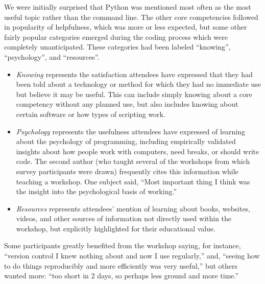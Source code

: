 \documentclass[10pt, twocolumn]{article}
\begin{document}
We were initially surprised that Python was mentioned most often as the most useful topic rather than the command line.
The other core competencies followed in popularity of helpfulness,
which was more or less expected,
but some other fairly popular categories emerged during the coding process which were completely unanticipated.
These categories had been labeled ``knowing'', ``psychology'', and ``resources''.

\begin{figure}
\end{figure}

\begin{itemize}

	\item
	\emph{Knowing} represents the satisfaction attendees have expressed that they had been told about a technology or method
	for which they had no immediate use but believe it may be useful.
	This can include simply knowing about a core competency without any planned use,
	but also includes knowing about certain software or how types of scripting work.
	
	\item
	\emph{Psychology} represents the usefulness attendees have expressed of learning about the psychology of programming,
	including empirically validated insights about how people work with computers,
	need breaks,
	or should write code.
	The second author (who taught several of the workshops from which survey participants were drawn)
	frequently cites this information while teaching a workshop.
        One subject said,
        ``Most important thing I think was the insight into the psychological basis of working.''
	
	\item
	\emph{Resources} represents attendees' mention of learning about books, websites, videos, and other sources of information
	not directly used within the workshop,
	but explicitly highlighted for their educational value.

\end{itemize}

Some participants greatly benefited from the workshop saying,
for instance,
``version control I knew nothing about and now I use regularly,''
and,
``seeing how to do things reproducibly and more efficiently was very useful,''
but others wanted more:
``too short in 2 days, so perhaps less ground and more time.''
\end{document}

